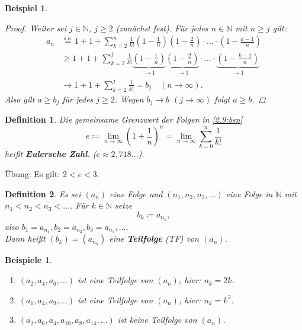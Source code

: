 \documentclass[12pt]{extreport} %
\newcommand{\N}{\mathbb{N}}
\theoremstyle{named}
\theoremstyle{itshape}
\newtheorem*{definition}{Definition}
\theoremstyle{normal}
\newtheorem{beispiel}[unnamedtheorem]{Beispiel}
\newtheorem*{beispiele}{Beispiele}
\begin{document}
\begin{beispiel}
\begin{proof}
		Weiter sei $j \in \N$, $j \geq 2$ (zunächst fest). Für jedes $n \in \N$ mit $n \geq j$ gilt:
		\begin{align*}
			a_{n} & \overset{s.o.}{=} 1 + 1 + \sum_{k=2}^{n} \frac{1}{k!} (1-\frac{1}{n})(1-\frac{2}{n}) \cdot \dotsc \cdot (1-\frac{k-1}{n}) \\
				  & \geq 1 + 1 + \sum_{k = 2}^{j} \frac{1}{k!} \underbrace{(1-\frac{1}{n})}_{\rightarrow 1} 
				  \underbrace{(1-\frac{2}{n})}_{\rightarrow 1} \cdot \dotsc \cdot \underbrace{(1-\frac{k-1}{n})}_{\rightarrow 1} \\
				  & \rightarrow 1 + 1 + \sum_{k=2}^{j} \frac{1}{k!} = b_{j} \quad (n \rightarrow \infty).
		\end{align*}
		Also gilt $a \geq b_{j}$ für jedes $j \geq 2$. Wegen $b_j \to b$ $(j \rightarrow \infty)$ folgt $a \geq b$.
	\end{proof}
\end{beispiel}

\begin{definition} Die gemeinsame Grenzwert der Folgen in \ref{2.9:bsp}
	$$
		e \coloneqq \lim_{n \rightarrow \infty} \left( 1 + \frac{1}{n} \right)^{n} = \lim_{n \rightarrow \infty} \sum_{k = 0}^{n} \frac{1}{k!} 
	$$
	hei{\ss}t \textbf{Eulersche Zahl}. ($e \approx 2,718\dotsc$).
\end{definition}

Übung: Es gilt: $2 < e < 3$.

\begin{definition} 
	Es sei $(a_{n})$ eine Folge und $(n_{1}, n_{2}, n_{3}, \dotsc)$ eine Folge in $\N$ mit \\
	$n_{1} < n_{2} < n_{3} < \dotsc$. Für $k \in \N$ setze
	$$
		b_{k} \coloneqq a_{n_{k}},
	$$
	also $b_{1} = a_{n_{1}}, b_{2} = a_{n_{2}}, b_{3} = a_{n_{3}},\dotsc$. \\
	Dann hei{\ss}t $(b_{k}) = (a_{n_{k}})$ eine \textbf{Teilfolge} (TF) von $(a_{n})$.
\end{definition}


\begin{beispiele}\
	\begin{enumerate}
		\item $(a_{2}, a_{4}, a_{6}, \dotsc)$ ist eine Teilfolge von $(a_{n})$; hier: $n_{k} = 2k$.
		\item $(a_{1}, a_{4}, a_{9}, \dotsc)$ ist eine Teilfolge von $(a_{n})$; hier: $n_{k} = k^2$.
		\item $(a_{2}, a_{6}, a_{4}, a_{10}, a_{8}, a_{14}, \dotsc)$ ist keine Teilfolge von $(a_{n})$.
	\end{enumerate}
\end{beispiele}
\end{document}
